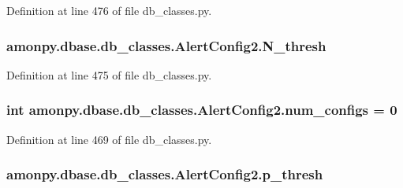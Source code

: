 Definition at line 476 of file db\-\_\-classes.\-py.

\hypertarget{classamonpy_1_1dbase_1_1db__classes_1_1_alert_config2_aa4e9d2584bdecbd5b2c7be15784c7684}{
\subsubsection[{N\-\_\-thresh}]{\setlength{\rightskip}{0pt plus 5cm}amonpy.\-dbase.\-db\-\_\-classes.\-Alert\-Config2.\-N\-\_\-thresh}}\label{classamonpy_1_1dbase_1_1db__classes_1_1_alert_config2_aa4e9d2584bdecbd5b2c7be15784c7684}


Definition at line 475 of file db\-\_\-classes.\-py.

\hypertarget{classamonpy_1_1dbase_1_1db__classes_1_1_alert_config2_a17be669e8bdfa435ca0fe275a71479dd}{
\subsubsection[{num\-\_\-configs}]{\setlength{\rightskip}{0pt plus 5cm}int amonpy.\-dbase.\-db\-\_\-classes.\-Alert\-Config2.\-num\-\_\-configs = 0\hspace{0.3cm}{\ttfamily [static]}}}\label{classamonpy_1_1dbase_1_1db__classes_1_1_alert_config2_a17be669e8bdfa435ca0fe275a71479dd}


Definition at line 469 of file db\-\_\-classes.\-py.

\hypertarget{classamonpy_1_1dbase_1_1db__classes_1_1_alert_config2_a8dbc3ae517192b47243d9cc10549c928}{
\subsubsection[{p\-\_\-thresh}]{\setlength{\rightskip}{0pt plus 5cm}amonpy.\-dbase.\-db\-\_\-classes.\-Alert\-Config2.\-p\-\_\-thresh}}\label{classamonpy_1_1dbase_1_1db__classes_1_1_alert_config2_a8dbc3ae517192b47243d9cc10549c928}


